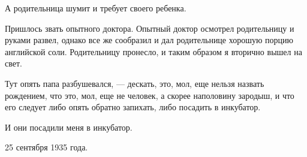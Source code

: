 А родительница шумит и требует своего ребенка.

Пришлось звать опытного доктора. Опытный доктор осмотрел родительницу и руками развел, однако все же сообразил и дал родительнице хорошую порцию английской соли. Родительницу пронесло, и таким образом я вторично вышел на свет.

Тут опять папа разбушевался, --- дескать, это, мол, еще нельзя назвать рождением, что это, мол, еще не человек, а скорее наполовину зародыш, и что его следует либо опять обратно запихать, либо посадить в инкубатор.

И они посадили меня в инкубатор.

25 сентября 1935 года.